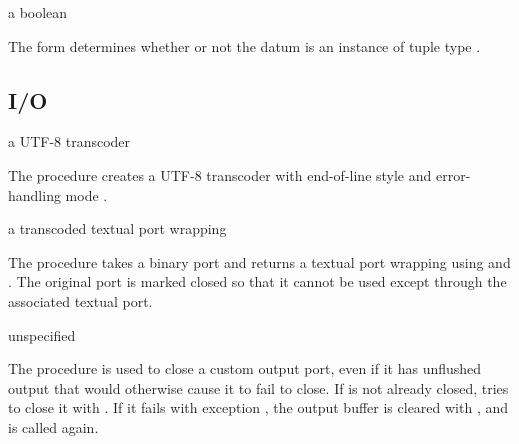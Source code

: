 \begin{syntax}
\end{syntax}
\returns{} a boolean

The  form determines whether or not the datum  is
an instance of tuple type .

\subsection {I/O}

\begin{procedure}
\end{procedure}
\returns{} a UTF-8 transcoder

The  procedure creates a UTF-8 transcoder
with end-of-line style  and error-handling mode
.

\begin{procedure}
\end{procedure}
\returns{} a transcoded textual port wrapping 

The  procedure takes a binary port  and
returns a textual port wrapping  using
 and . The
original port  is marked closed so that it cannot be used
except through the associated textual port.

\begin{procedure}
\end{procedure}
\returns{} unspecified

The  procedure is used to close a
custom output port, even if it has unflushed output that would
otherwise cause it to fail to close.  If  is not already
closed,  tries to close it with
. If it fails with exception
, the output
buffer is cleared with , and
 is called again.


